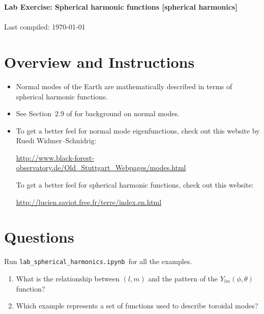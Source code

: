 \documentclass[11pt,titlepage,fleqn]{article}
\newcommand{\tfile}{{\tt lab\_spherical\_harmonics.ipynb}}
\begin{document}

\begin{spacing}{1.2} 
\centering
{\large \bf Lab Exercise: Spherical harmonic functions [spherical harmonics]} \\
\cltag\ \\
Last compiled: \today
\end{spacing}

\section{Overview and Instructions}

\begin{itemize}
\item Normal modes of the Earth are mathematically described in terms of spherical harmonic functions.

\item See Section~2.9 of \citet{SteinWysession} for background on normal modes.

\item To get a better feel for normal mode eigenfunctions, check out this website by Ruedi Widmer--Schnidrig:

\url{http://www.black-forest-observatory.de/Old_Stuttgart_Webpages/modes.html}

To get a better feel for spherical harmonic functions, check out this website:

\url{http://lucien.saviot.free.fr/terre/index.en.html}

\end{itemize}


\section{Questions}

Run \tfile\ for all the examples.

\begin{enumerate}
\item What is the relationship between $(l,m)$ and the pattern of the $Y_{lm}(\phi,\theta)$ function?

\vspace{1cm}

\item Which example represents a set of functions used to describe toroidal modes?

\vspace{1cm}

\end{enumerate}



\end{document}
